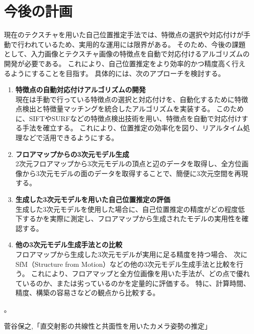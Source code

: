 \documentclass[]{jarticle}          %
\begin{document}
\section{今後の計画}
現在のテクスチャを用いた自己位置推定手法では、特徴点の選択や対応付けが手動で行われているため、実用的な運用には限界がある。
そのため、今後の課題として、入力画像とテクスチャ画像の特徴点を自動で対応付けるアルゴリズムの開発が必要である。
これにより、自己位置推定をより効率的かつ精度高く行えるようにすることを目指す。
具体的には、次のアプローチを検討する。

\begin{enumerate}
  \item \textbf{特徴点の自動対応付けアルゴリズムの開発} \\
  現在は手動で行っている特徴点の選択と対応付けを、自動化するために特徴点検出と特徴量マッチングを統合したアルゴリズムを実装する。
  このために、SIFTやSURFなどの特徴点検出技術を用い、特徴点を自動で対応付けする手法を確立する。
  これにより、位置推定の効率化を図り、リアルタイム処理などで活用できるようにする。

  \item \textbf{フロアマップからの3次元モデル生成} \\
  2次元フロアマップから3次元モデルの頂点と辺のデータを取得し、全方位画像から3次元モデルの面のデータを取得することで、簡便に3次元空間を再現する。

  \item \textbf{生成した3次元モデルを用いた自己位置推定の評価} \\
  生成した3次元モデルを使用した場合に、自己位置推定の精度がどの程度低下するかを実際に測定し、フロアマップから生成されたモデルの実用性を確認する。

  \item \textbf{他の3次元モデル生成手法との比較} \\
  フロアマップから生成した3次元モデルが実用に足る精度を持つ場合、
  次にSfM（Structure from Motion）などの他の3次元モデル生成手法と比較を行う。
  これにより、フロアマップと全方位画像を用いた手法が、どの点で優れているのか、または劣っているのかを定量的に評価する。
  特に、計算時間、精度、構築の容易さなどの観点から比較する。
\end{enumerate}。


\begin{thebibliography}{99}
   菅谷保之,「直交射影の共線性と共面性を用いたカメラ姿勢の推定」
\end{thebibliography}
\end{document}
